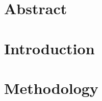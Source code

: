 \documentclass{article}
\begin{document}
    \fi

    \section*{Abstract}

    \section*{Introduction}

    \section*{Methodology}




\end{document}
